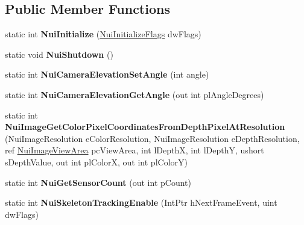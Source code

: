\subsection*{Public Member Functions}
\begin{DoxyCompactItemize}
\item 
\mbox{\label{class_kinect_wrapper_a2fdd21af7c89b1d15bb20c412577ac29}} 
static int {\bfseries Nui\+Initialize} (\mbox{\hyperlink{class_kinect_wrapper_aa14891c91bfa8c6fe4761146055656da}{Nui\+Initialize\+Flags}} dw\+Flags)
\item 
\mbox{\label{class_kinect_wrapper_ab80346c061343035f00f42dc89bb6e2e}} 
static void {\bfseries Nui\+Shutdown} ()
\item 
\mbox{\label{class_kinect_wrapper_ae6798571cfc956305dc31020c72bf7ce}} 
static int {\bfseries Nui\+Camera\+Elevation\+Set\+Angle} (int angle)
\item 
\mbox{\label{class_kinect_wrapper_aaaf8d63c9fabe873fe171f3a3e5f7ec7}} 
static int {\bfseries Nui\+Camera\+Elevation\+Get\+Angle} (out int pl\+Angle\+Degrees)
\item 
\mbox{\label{class_kinect_wrapper_ac026341b4cf4127a4a84b24fa5547e59}} 
static int {\bfseries Nui\+Image\+Get\+Color\+Pixel\+Coordinates\+From\+Depth\+Pixel\+At\+Resolution} (Nui\+Image\+Resolution e\+Color\+Resolution, Nui\+Image\+Resolution e\+Depth\+Resolution, ref \mbox{\hyperlink{struct_kinect_wrapper_1_1_nui_image_view_area}{Nui\+Image\+View\+Area}} pc\+View\+Area, int l\+DepthX, int l\+DepthY, ushort s\+Depth\+Value, out int pl\+ColorX, out int pl\+ColorY)
\item 
\mbox{\label{class_kinect_wrapper_a7d786c97adcf86b866e4c5233b63f5fd}} 
static int {\bfseries Nui\+Get\+Sensor\+Count} (out int p\+Count)
\item 
\mbox{\label{class_kinect_wrapper_a3e8731807ba8636cd10ae1b8cc7a7e4f}} 
static int {\bfseries Nui\+Skeleton\+Tracking\+Enable} (Int\+Ptr h\+Next\+Frame\+Event, uint dw\+Flags)
\item 
\mbox{\label{class_kinect_wrapper_a07d73b189c89e8f98ee9e03623b95de3}} 

\end{DoxyCompactItemize}
